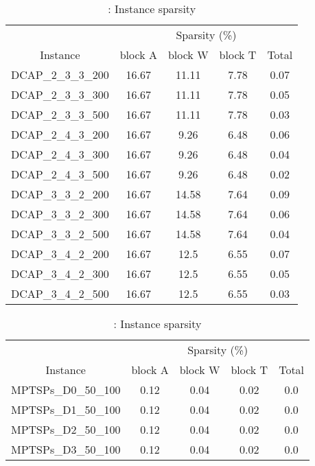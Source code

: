\begin{table}[H]
\centering
\caption{\dcap: Instance sparsity} 
\label{table:instance_sparsity_info_dcap} 
\begin{tabular}{|c|cccc|}
\hline 
& \multicolumn{4}{c|}{Sparsity (\%)}  \\ \cline{2-5}
Instance      & block A & block W & block T & Total \\ \hline
DCAP\_2\_3\_3\_200 & 16.67 & 11.11 & 7.78 & 0.07 \\ 
DCAP\_2\_3\_3\_300 & 16.67 & 11.11 & 7.78 & 0.05 \\ 
DCAP\_2\_3\_3\_500 & 16.67 & 11.11 & 7.78 & 0.03 \\ 
DCAP\_2\_4\_3\_200 & 16.67 & 9.26 & 6.48 & 0.06 \\ 
DCAP\_2\_4\_3\_300 & 16.67 & 9.26 & 6.48 & 0.04 \\ 
DCAP\_2\_4\_3\_500 & 16.67 & 9.26 & 6.48 & 0.02 \\ 
DCAP\_3\_3\_2\_200 & 16.67 & 14.58 & 7.64 & 0.09 \\ 
DCAP\_3\_3\_2\_300 & 16.67 & 14.58 & 7.64 & 0.06 \\ 
DCAP\_3\_3\_2\_500 & 16.67 & 14.58 & 7.64 & 0.04 \\ 
DCAP\_3\_4\_2\_200 & 16.67 & 12.5 & 6.55 & 0.07 \\ 
DCAP\_3\_4\_2\_300 & 16.67 & 12.5 & 6.55 & 0.05 \\ 
DCAP\_3\_4\_2\_500 & 16.67 & 12.5 & 6.55 & 0.03 \\ 
\hline 
\end{tabular} 
\end{table} 


\begin{table}[H]
\centering
\caption{\mptsps: Instance sparsity} 
\label{table:instance_sparsity_info_mptsps} 
\begin{tabular}{|c|cccc|}
\hline 
& \multicolumn{4}{c|}{Sparsity (\%)}  \\ \cline{2-5}
Instance      & block A & block W & block T & Total \\ \hline
MPTSPs\_D0\_50\_100 & 0.12 & 0.04 & 0.02 & 0.0 \\ 
MPTSPs\_D1\_50\_100 & 0.12 & 0.04 & 0.02 & 0.0 \\ 
MPTSPs\_D2\_50\_100 & 0.12 & 0.04 & 0.02 & 0.0 \\ 
MPTSPs\_D3\_50\_100 & 0.12 & 0.04 & 0.02 & 0.0 \\ 
\hline 
\end{tabular} 
\end{table} 


